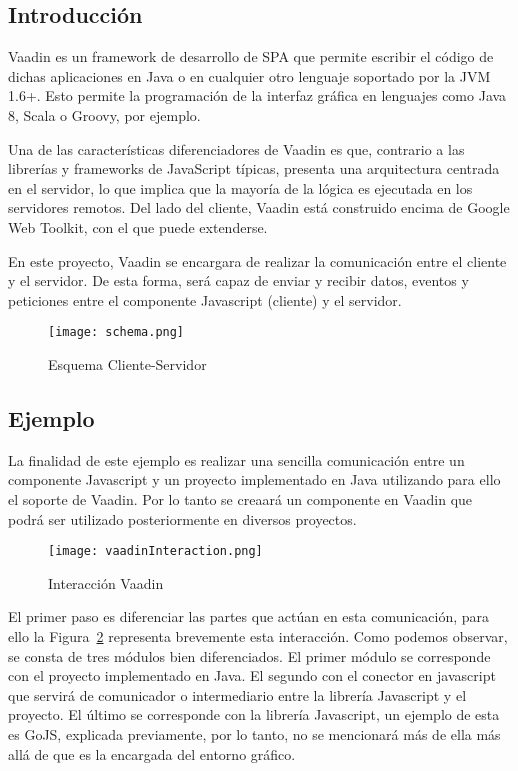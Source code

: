 \subsection{Introducción}
	Vaadin\cite{vaadin} es un framework de desarrollo de SPA que permite escribir el código de dichas aplicaciones en Java o en cualquier otro lenguaje soportado por la JVM 1.6+. Esto permite la programación de la interfaz gráfica en lenguajes como Java 8, Scala o Groovy, por ejemplo.


	Una de las características diferenciadores de Vaadin es que, contrario a las librerías y frameworks de JavaScript típicas, presenta una arquitectura centrada en el servidor, lo que implica que la mayoría de la lógica es ejecutada en los servidores remotos. Del lado del cliente, Vaadin está construido encima de Google Web Toolkit, con el que puede extenderse.


	En este proyecto, Vaadin se encargara de realizar la comunicación entre el cliente y el servidor. De esta forma, será capaz de enviar y recibir datos, eventos y peticiones entre el componente Javascript (cliente) y el servidor.


	\begin{figure}[!tb]
		\centering
		\texttt{[image: schema.png]}
		\caption{Esquema Cliente-Servidor}\label{fig:schema}
	\end{figure}
 			
\subsection{Ejemplo}
 	La finalidad de este ejemplo es realizar una sencilla comunicación entre un componente Javascript y un proyecto implementado en Java utilizando para ello el soporte de Vaadin. Por lo tanto se creaará un componente en Vaadin que podrá ser utilizado posteriormente en diversos proyectos.
 	
 	\begin{figure}[!tb]
 		\centering
 		\texttt{[image: vaadinInteraction.png]}
 		\caption{Interacción Vaadin}\label{fig:vaadinInteraction}
 	\end{figure}
 	
 	El primer paso es diferenciar las partes que actúan en esta comunicación, para ello la Figura~\ref{fig:vaadinInteraction} representa brevemente esta interacción. Como podemos observar, se consta de tres módulos bien diferenciados. El primer módulo se corresponde con el proyecto implementado en Java. El segundo con el conector en javascript que servirá de comunicador o intermediario entre la librería Javascript y el proyecto. El último se corresponde con la librería Javascript, un ejemplo de esta es GoJS, explicada previamente, por lo tanto, no se mencionará más de ella más allá de que es la encargada del entorno gráfico.
 	
